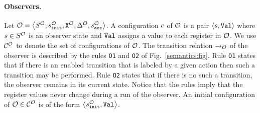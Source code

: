 
\paragraph{Observers.}

Let ${\mathcal O}=\left\langle S^{\mathcal O},s^{\mathcal O}_{\tt init},{\tt X}^{{\mathcal O}},\Delta^{\mathcal O},s^{\mathcal O}_{\tt acc}\right\rangle$.
%
A configuration $c$ of ${\mathcal O}$
is a pair $\left\langle s,{\tt Val}\right\rangle$
where $s\in S^{\mathcal O}$ is an observer state and
${\tt Val}$ assigns a value to each register in ${\mathcal O}$.
%
%
We use ${\mathcal C}^{{\mathcal O}}$ to denote the set of configurations
of ${\mathcal O}$.
%
The transition relation ${\xrightarrow{}{}}_{\!\!{\mathcal O}}$
of the observer is described by the rules
{\tt O1} and {\tt O2} of Fig.~\ref{semantics:fig}.
%
Rule {\tt O1} states that
if there is an enabled  transition that is labeled by a given action
  then such a transition may be performed. 
%
Rule {\tt O2} states that if there is no
such a transition, the observer remains in its current state.
%
Notice that the rules imply that the register
values never change during a run of the observer. 
%
An initial configuration of ${\mathcal O}\in{\mathcal C}^{{\mathcal O}}$
is of the form $\left\langle s^{\mathcal O}_{\tt init},{\tt Val}\right\rangle$.



